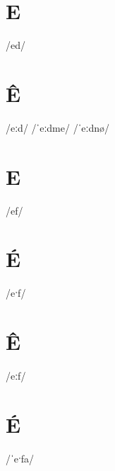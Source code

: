 \documentclass[10pt,a4paper,twoside]{book}
\begin{document}
\section*{E}

\begin{multicols}{3}
 {/ed/} {}
\end{multicols}

\section*{Ê}

\begin{multicols}{3}
 {/eːd/} {}
 {/ˈeːdme/} {}
 {/ˈeːdnø/} {}
\end{multicols}

\section*{E}

\begin{multicols}{3}
 {/ef/} {}
\end{multicols}

\section*{É}

\begin{multicols}{3}
 {/eˑf/} {}
\end{multicols}

\section*{Ê}

\begin{multicols}{3}
 {/eːf/} {}
\end{multicols}

\section*{É}

\begin{multicols}{3}
 {/ˈeˑfa/} {}
\end{multicols}
\end{document}

